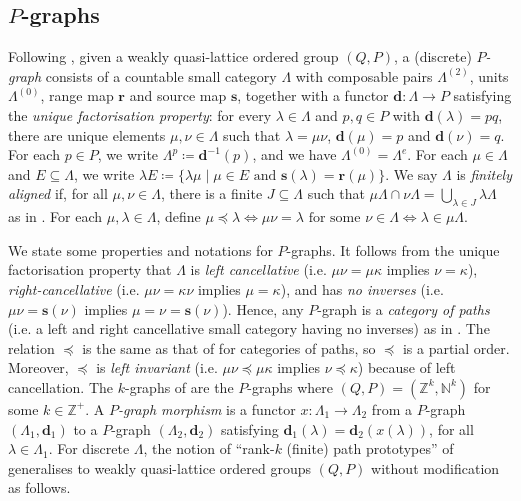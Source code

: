 \documentclass[11pt]{amsart}
\theoremstyle{definition}
\numberwithin{thm}{section}
\numberwithin{equation}{section}
\newcommand{\Define}[1]{\emph{#1}}
\newcommand{\setof}[2]{\{ #1 \mid #2 \}}
\newcommand{\N}{\mathbb{N}}
\newcommand{\range}{\mathbf{r}}
\newcommand{\source}{\mathbf{s}}
\newcommand{\degree}{\mathbf{d}}
\newcommand{\composablepairs}[1]{#1^{(2)}}
\newcommand{\unitspace}[1]{#1^{(0)}}
\begin{document}
\subsection{\texorpdfstring{$P$-graphs}{P-graphs}}
\label{sec:Pgraphs}

Following \cite{BSV13}, given a weakly quasi-lattice ordered group $(Q, P)$, a (discrete) \Define{$P$-graph} consists of a countable small category $\Lambda$ with composable pairs $\composablepairs{\Lambda}$, units $\unitspace{\Lambda}$, range map $\range$ and source map $\source$, together with a functor $\degree \colon \Lambda \to P$ satisfying the \Define{unique factorisation property}: for every $\lambda \in \Lambda$ and $p, q \in P$ with $\degree(\lambda) = pq$, there are unique elements $\mu, \nu \in \Lambda$ such that $\lambda = \mu\nu$, $\degree(\mu) = p$ and $\degree(\nu) = q$.
For each $p \in P$, we write $\Lambda^p \coloneqq \degree^{-1}(p)$, and we have $\unitspace{\Lambda} = \Lambda^e$.
For each $\mu \in \Lambda$ and $E \subseteq \Lambda$, we write 
\(
\lambda E \coloneqq \setof{
\lambda\mu
}{
\mu\in E \text{ and } \source(\lambda) = \range(\mu)
}.
\)
We say $\Lambda$ is \Define{finitely aligned} if, for all $\mu, \nu \in \Lambda$, there is a finite $J \subseteq \Lambda$ such that $\mu\Lambda \cap \nu\Lambda = \bigcup_{\lambda \in J} \lambda\Lambda$ as in \cite[Page 729]{Spi12}. 
For each $\mu, \lambda \in \Lambda$, define $\mu \preceq \lambda \iff \mu\nu = \lambda \text{ for some } \nu \in \Lambda \iff \lambda \in \mu\Lambda$.

We state some properties and notations for $P$-graphs.
It follows from the unique factorisation property that $\Lambda$ is \Define{left cancellative} (i.e. $\mu\nu = \mu\kappa$ implies $\nu = \kappa$), \Define{right-cancellative} (i.e. $\mu\nu = \kappa\nu$ implies $\mu = \kappa$), and has \Define{no inverses} (i.e. $\mu\nu = \source(\nu)$ implies $\mu = \nu = \source(\nu)$). 
Hence, any $P$-graph is a \Define{category of paths} (i.e. a left and right cancellative small category having no inverses) as in \cite[Example 2.2(6)]{Spi14}.
The relation $\preceq$ is the same as that of \cite[Definition 2.5]{Spi14} for categories of paths, so $\preceq$ is a partial order. 
Moreover, $\preceq$ is \Define{left invariant} (i.e. $\mu\nu \preceq \mu\kappa$ implies $\nu \preceq \kappa$) because of left cancellation.
The $k$-graphs of \cite{KP00} are the $P$-graphs where $(Q, P) = (\mathbb{Z}^k, \N^k)$ for some $k \in \mathbb{Z}^+$.
A \Define{$P$-graph morphism} is a functor $x \colon \Lambda_1 \to \Lambda_2$ from a $P$-graph $(\Lambda_1, \degree_1)$ to a $P$-graph $(\Lambda_2, \degree_2)$ satisfying $\degree_1(\lambda) = \degree_2(x(\lambda))$, for all $\lambda \in \Lambda_1$.
For discrete $\Lambda$, the notion of ``rank-$k$ (finite) path prototypes'' of \cite{Yee07} generalises to weakly quasi-lattice ordered groups $(Q, P)$ without modification as follows.
\end{document}

